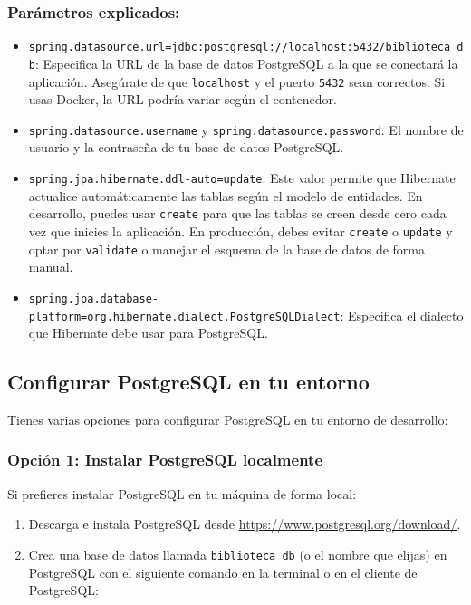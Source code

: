 \documentclass[11pt]{article}
\begin{document}
\subsubsection{Parámetros explicados:}
\label{sec:orgfe60c63}
\begin{itemize}
\item \texttt{spring.datasource.url=jdbc:postgresql://localhost:5432/biblioteca\_db}: Especifica la URL de la base de datos PostgreSQL a la que se conectará la aplicación. Asegúrate de que \texttt{localhost} y el puerto \texttt{5432} sean correctos. Si usas Docker, la URL podría variar según el contenedor.
\item \texttt{spring.datasource.username} y \texttt{spring.datasource.password}: El nombre de usuario y la contraseña de tu base de datos PostgreSQL.
\item \texttt{spring.jpa.hibernate.ddl-auto=update}: Este valor permite que Hibernate actualice automáticamente las tablas según el modelo de entidades. En desarrollo, puedes usar \texttt{create} para que las tablas se creen desde cero cada vez que inicies la aplicación. En producción, debes evitar \texttt{create} o \texttt{update} y optar por \texttt{validate} o manejar el esquema de la base de datos de forma manual.
\item \texttt{spring.jpa.database-platform=org.hibernate.dialect.PostgreSQLDialect}: Especifica el dialecto que Hibernate debe usar para PostgreSQL.
\end{itemize}

\subsection{Configurar PostgreSQL en tu entorno}
\label{sec:orga25adf3}

Tienes varias opciones para configurar PostgreSQL en tu entorno de desarrollo:

\subsubsection{Opción 1: Instalar PostgreSQL localmente}
\label{sec:org9b13107}

Si prefieres instalar PostgreSQL en tu máquina de forma local:

\begin{enumerate}
\item Descarga e instala PostgreSQL desde \url{https://www.postgresql.org/download/}.
\item Crea una base de datos llamada \texttt{biblioteca\_db} (o el nombre que elijas) en PostgreSQL con el siguiente comando en la terminal o en el cliente de PostgreSQL:
\end{enumerate}
\end{document}
